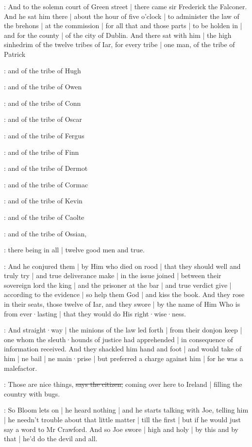 :
And to the solemn court of Green street |
there came sir Frederick the Falconer.
And he sat him there |
about the hour of five o'clock |
to administer the law of the brehons |
at the commission |
for all that and those parts |
to be holden in |
and for the county |
of the city of Dublin.
And there sat with him |
the high sinhedrim of the twelve tribes of Iar,
for every tribe |
one man,
of the tribe of Patrick

:
and of the tribe of Hugh

:
and of the tribe of Owen

:
and of the tribe of Conn

:
and of the tribe of Oscar

:
and of the tribe of Fergus

:
and of the tribe of Finn

:
and of the tribe of Dermot

:
and of the tribe of Cormac

:
and of the tribe of Kevin

:
and of the tribe of Caolte

:
and of the tribe of Ossian,

:
there being in all
 |
twelve good men and true.

:
And he conjured them |
by Him who died on rood |
that they should well and truly try |
and true deliverance make |
in the issue joined |
between their sovereign lord the king |
and the prisoner at the bar |
and true verdict give |
according to the evidence |
so help them God |
and kiss the book.
And they rose in their seats,
those twelve of Iar,
and they swore |
by the name of Him Who is from ever·lasting |
that they would do His right·wise·ness.

:
And straight·way |
the minions of the law led forth |
from their donjon keep |
one whom the sleuth·hounds of justice had apprehended |
in consequence of information received.
And they shackled him hand and foot |
and would take of him |
ne bail |
ne main·prise |
but preferred a charge against him
 |
for he was a malefactor.

\citizen:
Those are nice things,
\sout{says the citizen,}
coming over here to Ireland |
filling the country with bugs.

\Nq:
So Bloom lets on |
he heard nothing |
and he starts talking with Joe,
telling him |
he needn't trouble about that little matter |
till the first |
but if he would just say a word to Mr Crawford.
And so Joe swore |
high and holy |
by this and by that |
he'd do the devil and all.

